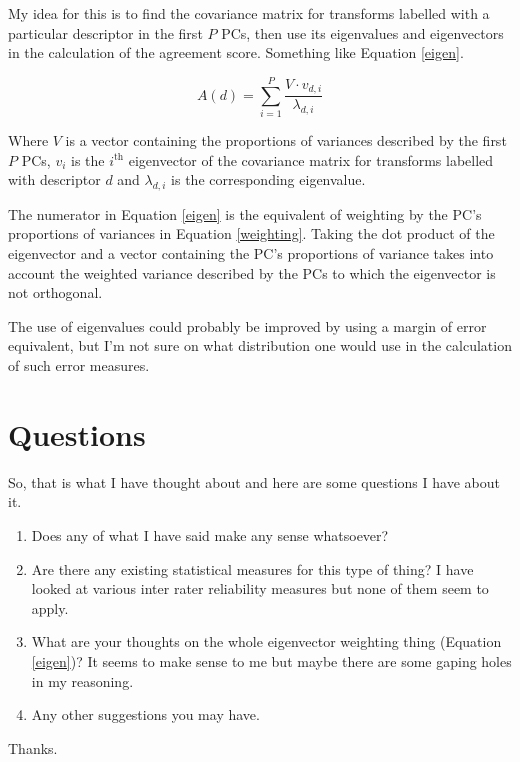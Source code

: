 \documentclass[a4paper]{article}
\begin{document}
My idea for this is to find the covariance matrix for transforms labelled with a particular descriptor in the first $P$ PCs,
then use its eigenvalues and eigenvectors in the calculation of the agreement score. Something like Equation \ref{eigen}.

	\begin{equation}
		A(d) = \sum_{i=1}^{P} \frac{V \cdot v_{d,i}}{\lambda_{d,i}}
		\label{eigen}
	\end{equation}

Where $V$ is a vector containing the proportions of variances described by the first $P$ PCs, $v_{i}$ is the
$i^{\textrm{th}}$ eigenvector of the covariance matrix for transforms labelled with descriptor $d$ and $\lambda_{d,i}$ is
the corresponding eigenvalue.

The numerator in Equation \ref{eigen} is the equivalent of weighting by the PC's proportions of variances in Equation
\ref{weighting}. Taking the dot product of the eigenvector and a vector containing the PC's proportions of variance takes
into account the weighted variance described by the PCs to which the eigenvector is not orthogonal.

The use of eigenvalues could probably be improved by using a margin of error equivalent, but I'm not sure on what
distribution one would use in the calculation of such error measures.

\section*{Questions}
So, that is what I have thought about and here are some questions I have about it.

	\begin{enumerate}
		\item Does any of what I have said make any sense whatsoever?
		\item Are there any existing statistical measures for this type of thing? I have looked at various inter
			rater reliability measures but none of them seem to apply.
		\item What are your thoughts on the whole eigenvector weighting thing (Equation \ref{eigen})? It seems to
			make sense to me but maybe there are some gaping holes in my reasoning.
		\item Any other suggestions you may have.
	\end{enumerate}

Thanks.
\end{document}
